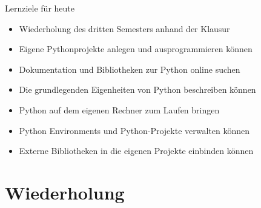 \begin{frame}{Lernziele für heute}
    \begin{itemize}
        \item Wiederholung des dritten Semesters anhand der Klausur
        \item Eigene Pythonprojekte anlegen und ausprogrammieren können
        \item Dokumentation und Bibliotheken zur Python online suchen
        \item Die grundlegenden Eigenheiten von Python beschreiben können
        \item Python auf dem eigenen Rechner zum Laufen bringen
        \item Python Environments und Python-Projekte verwalten können
        \item Externe Bibliotheken in die eigenen Projekte einbinden können
    \end{itemize}
\end{frame}

\section{Wiederholung}

